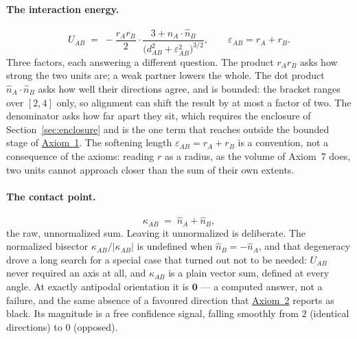 \documentclass[12pt, a4paper]{article}
\begin{document}
\paragraph{The interaction energy.}
\begin{equation}
    U_{AB} \;=\; -\frac{r_A r_B}{2}\cdot
    \frac{3+\hat n_A\cdot\hat n_B}
         {\bigl(d_{AB}^2+\varepsilon_{AB}^2\bigr)^{3/2}},
    \qquad
    \varepsilon_{AB} = r_A + r_B.
    \label{eq:assembly_energy}
\end{equation}
Three factors, each answering a different question. The product
$r_Ar_B$ asks how strong the two units are; a weak partner lowers the
whole. The dot product $\hat n_A\cdot\hat n_B$ asks how well their
directions agree, and is bounded: the bracket ranges over $[2,4]$
only, so alignment can shift the result by at most a factor of two.
The denominator asks how far apart they sit, which requires the
enclosure of Section~\ref{sec:enclosure} and is the one term that
reaches outside the bounded stage of \hyperref[subsec:axiom1]{Axiom~1}. The softening length $\varepsilon_{AB}=r_A+r_B$ is a convention, not a consequence of the axioms: reading $r$ as a radius, as the volume of Axiom~7 does, two units cannot approach closer than the sum of their own extents.

\paragraph{The contact point.}
\begin{equation}
    \kappa_{AB} \;=\; \hat n_A + \hat n_B,
    \label{eq:assembly_contact}
\end{equation}
the raw, unnormalized sum. Leaving it unnormalized is deliberate.
The normalized bisector $\kappa_{AB}/\lvert\kappa_{AB}\rvert$ is
undefined when $\hat n_B = -\hat n_A$, and that degeneracy drove a
long search for a special case that turned out not to be needed:
$U_{AB}$ never required an axis at all, and $\kappa_{AB}$ is a plain
vector sum, defined at every angle. At exactly antipodal orientation
it is $\mathbf{0}$ --- a computed answer, not a failure, and the same
absence of a favoured direction that \hyperref[subsec:axiom_null]{Axiom~2}
reports as black. Its magnitude is a free confidence signal, falling
smoothly from $2$ (identical directions) to $0$ (opposed).
\end{document}
